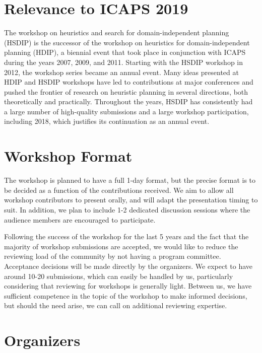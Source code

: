 \documentclass[10pt]{article}
\begin{document}

\section*{Relevance to ICAPS 2019}

The workshop on heuristics and search for domain-independent planning (HSDIP) is
the successor of the workshop on heuristics for domain-independent planning
(HDIP), a biennial event that took place in conjunction with ICAPS during the
years 2007, 2009, and 2011. Starting with the HSDIP workshop in 2012, the
workshop series became an annual event.
Many ideas presented at HDIP and HSDIP workshops have led to contributions at
major conferences and pushed the frontier of research on heuristic planning in
several directions, both theoretically and practically.
Throughout the years, HSDIP has consistently had a large number of
high-quality submissions and a large workshop participation, including 2018,
which justifies its continuation as an annual event.

\section*{Workshop Format}

The workshop is planned to have a full 1-day format, but the precise
format is to be decided as a function of the contributions received.
We aim to allow all workshop contributors to present orally, and will
adapt the presentation timing to suit. In addition, we plan to include
1-2 dedicated discussion sessions where the audience members are
encouraged to participate.

Following the success of the workshop for the last 5 years and the fact
that the majority of workshop submissions are accepted, we would like to reduce
the reviewing load of the community by not having a program
committee. Acceptance decisions will be made directly by the
organizers. We expect to have around 10-20 submissions, which can
easily be handled by us, particularly considering that reviewing for
workshops is generally light. Between us, we have sufficient
competence in the topic of the workshop to make informed decisions,
but should the need arise, we can call on additional reviewing
expertise.

\section*{Organizers}
\end{document}
